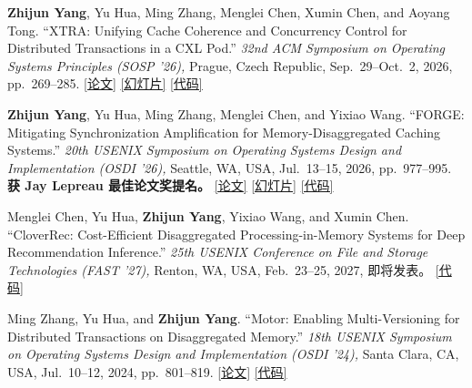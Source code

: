 \documentclass[a4paper,11pt]{article}
\newcommand{\resumelink}[2]{\href{#1}{[#2]}}
\begin{document}
\begin{enumerate}[
  leftmargin=1.55em,
  label={\textup{[\arabic*]}},
  itemsep=0.42em,
  topsep=0.05em,
  parsep=0pt,
  partopsep=0pt
]

\item
  \textbf{Zhijun Yang}, Yu Hua, Ming Zhang, Menglei Chen, Xumin Chen, and Aoyang Tong.
  ``XTRA: Unifying Cache Coherence and Concurrency Control for Distributed Transactions in a CXL Pod.''
  \textit{32nd ACM Symposium on Operating Systems Principles (SOSP '26),}
  Prague, Czech Republic, Sep.~29--Oct.~2, 2026, pp.~269--285.
  \resumelink{https://cszjyang.github.io/publications/2026/xtra/SOSP26-XTRA-paper.pdf}{论文}
  \resumelink{https://cszjyang.github.io/publications/2026/xtra/SOSP26-XTRA-slides.pdf}{幻灯片}
  \resumelink{https://github.com/cszjyang/xtra}{代码}

\item
  \textbf{Zhijun Yang}, Yu Hua, Ming Zhang, Menglei Chen, and Yixiao Wang.
  ``FORGE: Mitigating Synchronization Amplification for Memory-Disaggregated Caching Systems.''
  \textit{20th USENIX Symposium on Operating Systems Design and Implementation (OSDI '26),}
  Seattle, WA, USA, Jul.~13--15, 2026, pp.~977--995.
  \textbf{获 Jay Lepreau 最佳论文奖提名。}
  \resumelink{https://cszjyang.github.io/publications/2026/forge/OSDI26-FORGE-paper.pdf}{论文}
  \resumelink{https://cszjyang.github.io/publications/2026/forge/OSDI26-FORGE-slides.pdf}{幻灯片}
  \resumelink{https://github.com/cszjyang/forge}{代码}

\item
  Menglei Chen, Yu Hua, \textbf{Zhijun Yang}, Yixiao Wang, and Xumin Chen.
  ``CloverRec: Cost-Efficient Disaggregated Processing-in-Memory Systems for Deep Recommendation Inference.''
  \textit{25th USENIX Conference on File and Storage Technologies (FAST '27),}
  Renton, WA, USA, Feb.~23--25, 2027, 即将发表。
  \resumelink{https://github.com/LighT-chenml/CloverRec}{代码}

\item
  Ming Zhang, Yu Hua, and \textbf{Zhijun Yang}.
  ``Motor: Enabling Multi-Versioning for Distributed Transactions on Disaggregated Memory.''
  \textit{18th USENIX Symposium on Operating Systems Design and Implementation (OSDI '24),}
  Santa Clara, CA, USA, Jul.~10--12, 2024, pp.~801--819.
  \resumelink{https://www.usenix.org/conference/osdi24/presentation/zhang-ming}{论文}
  \resumelink{https://github.com/minghust/motor}{代码}

\end{enumerate}
\end{document}
